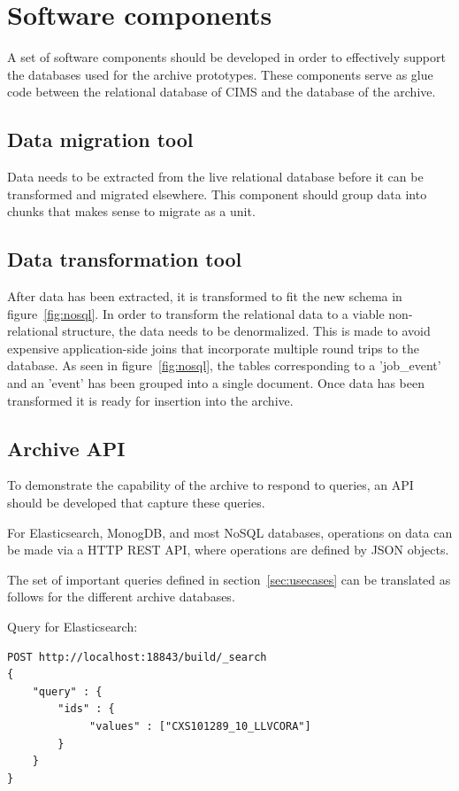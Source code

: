 \section{Software components}
A set of software components should be developed in order to effectively support the databases used for the archive prototypes. These components serve as glue code between the relational database of CIMS and the database of the archive. 
\subsection{Data migration tool}
Data needs to be extracted from the live relational database before it can be transformed and migrated elsewhere. This component should group data into chunks that makes sense to migrate as a unit. 

\subsection{Data transformation tool}
After data has been extracted, it is transformed to fit the new schema in figure~\ref{fig:nosql}. In order to transform the relational data to a viable non-relational structure, the data needs to be denormalized. This is made to avoid expensive application-side joins that incorporate multiple round trips to the database. As seen in figure~\ref{fig:nosql}, the tables corresponding to a 'job\_event' and an 'event' has been grouped into a single document. Once data has been transformed it is ready for insertion into the archive. 

\subsection{Archive API}
\label{sec:archiveapi}
To demonstrate the capability of the archive to respond to queries, an API should be developed that capture these queries. 

For Elasticsearch, MonogDB, and most NoSQL databases, operations on data can be made via a HTTP REST API, where operations are defined by JSON objects.

The set of important queries defined in section~\ref{sec:usecases} can be translated as follows for the different archive databases.

\label{q:getbuildEs}
Query for Elasticsearch: \\
\begin{verbatim}
POST http://localhost:18843/build/_search
{ 
    "query" : {
        "ids" : { 
             "values" : ["CXS101289_10_LLVCORA"]
        }
    }
}
\end{verbatim}

